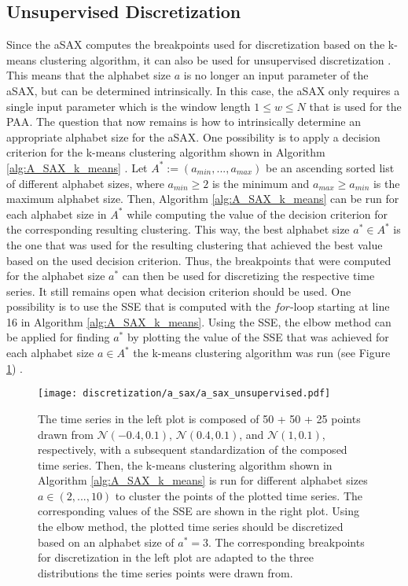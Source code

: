 \subsection*{Unsupervised Discretization}
Since the \ac{aSAX} computes the breakpoints used for discretization based on the k-means clustering algorithm, it can also be used for unsupervised discretization \cite{Unsupervised_Discretization}. This means that the alphabet size $a$ is no longer an input parameter of the \ac{aSAX}, but can be determined intrinsically. In this case, the \ac{aSAX} only requires a single input parameter which is the window length $1 \leq w \leq N$ that is used for the \ac{PAA}. \newline
The question that now remains is how to intrinsically determine an appropriate alphabet size for the \ac{aSAX}. One possibility is to apply a decision criterion for the k-means clustering algorithm shown in Algorithm \ref{alg:A_SAX_k_means} \cite{Unsupervised_Discretization}. Let $A^* := (a_{min}, ..., a_{max})$ be an ascending sorted list of different alphabet sizes, where $a_{min} \geq 2$ is the minimum and $a_{max} \geq a_{min}$ is the maximum alphabet size. Then, Algorithm \ref{alg:A_SAX_k_means} can be run for each alphabet size in $A^*$ while computing the value of the decision criterion for the corresponding resulting clustering. This way, the best alphabet size $a^* \in A^*$ is the one that was used for the resulting clustering that achieved the best value based on the used decision criterion. Thus, the breakpoints that were computed for the alphabet size $a^*$ can then be used for discretizing the respective time series. \newline
It still remains open what decision criterion should be used. One possibility is to use the \ac{SSE} that is computed with the $for$-loop starting at line 16 in Algorithm \ref{alg:A_SAX_k_means}. Using the \ac{SSE}, the elbow method can be applied for finding $a^*$ by plotting the value of the \ac{SSE} that was achieved for each alphabet size $a \in A^*$ the k-means clustering algorithm was run (see Figure \ref{fig:elbow_method}) \cite{Elbow_Method}.
\begin{figure}[htb]
\centering
\texttt{[image: discretization/a\_sax/a\_sax\_unsupervised.pdf]}
\caption[Adaptive Symbolic Aggregate Approximation - Elbow Method]{The time series in the left plot is composed of 50 + 50 + 25 points drawn from $\mathcal{N}(-0.4,0.1)$, $\mathcal{N}(0.4,0.1)$, and $\mathcal{N}(1,0.1)$, respectively, with a subsequent standardization of the composed time series. Then, the k-means clustering algorithm shown in Algorithm \ref{alg:A_SAX_k_means} is run for different alphabet sizes $a \in (2, ..., 10)$ to cluster the points of the plotted time series. The corresponding values of the \ac{SSE} are shown in the right plot. Using the elbow method, the plotted time series should be discretized based on an alphabet size of $a^* = 3$. The corresponding breakpoints for discretization in the left plot are adapted to the three distributions the time series points were drawn from.}
\label{fig:elbow_method}
\end{figure}
